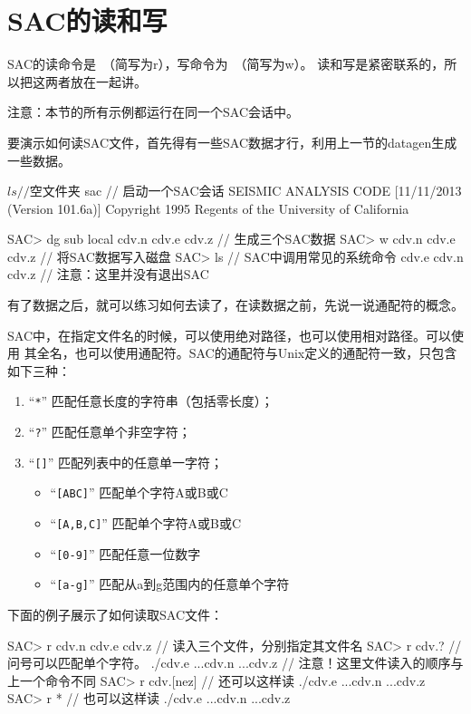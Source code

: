 \section{SAC的读和写}
\label{sec:read-and-write}
SAC的读命令是~（简写为r），写命令为~（简写为w）。
读和写是紧密联系的，所以把这两者放在一起讲。

注意：本节的所有示例都运行在同一个SAC会话中。

要演示如何读SAC文件，首先得有一些SAC数据才行，利用上一节的datagen生成一些数据。
\begin{SACCode}
$ ls                // 空文件夹
$ sac               // 启动一个SAC会话
 SEISMIC ANALYSIS CODE [11/11/2013 (Version 101.6a)]
 Copyright 1995 Regents of the University of California

SAC> dg sub local cdv.n cdv.e cdv.z     // 生成三个SAC数据
SAC> w cdv.n cdv.e cdv.z                // 将SAC数据写入磁盘
SAC> ls                                 // SAC中调用常见的系统命令
cdv.e  cdv.n  cdv.z
                                        // 注意：这里并没有退出SAC
\end{SACCode}

有了数据之后，就可以练习如何去读了，在读数据之前，先说一说通配符的概念。

SAC中，在指定文件名的时候，可以使用绝对路径，也可以使用相对路径。可以使用
其全名，也可以使用通配符。SAC的通配符与Unix定义的通配符一致，只包含如下三种：
\begin{enumerate}
\item ``\verb+*+'' 匹配任意长度的字符串（包括零长度）；
\item ``\verb+?+'' 匹配任意单个非空字符；
\item ``\verb+[]+'' 匹配列表中的任意单一字符；
    \begin{itemize}
        \item ``\verb+[ABC]+'' 匹配单个字符A或B或C
        \item ``\verb+[A,B,C]+'' 匹配单个字符A或B或C
        \item ``\verb+[0-9]+'' 匹配任意一位数字
        \item ``\verb+[a-g]+'' 匹配从a到g范围内的任意单个字符
    \end{itemize}
\end{enumerate}

下面的例子展示了如何读取SAC文件：
\begin{SACCode}
SAC> r cdv.n cdv.e cdv.z    // 读入三个文件，分别指定其文件名
SAC> r cdv.?                // 问号可以匹配单个字符。
./cdv.e ...cdv.n ...cdv.z   // 注意！这里文件读入的顺序与上一个命令不同
SAC> r cdv.[nez]            // 还可以这样读
./cdv.e ...cdv.n ...cdv.z
SAC> r *                    // 也可以这样读
./cdv.e ...cdv.n ...cdv.z
\end{SACCode}

